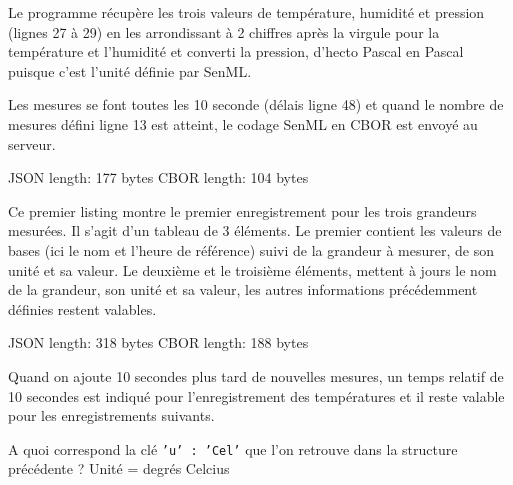 Le programme récupère les trois valeurs de température, humidité et pression (lignes 27 à 29) en les arrondissant à 2 chiffres après la virgule pour la température et l'humidité et converti la pression, d'hecto Pascal en Pascal puisque c'est l'unité définie par SenML. 

Les mesures se font toutes les 10 seconde (délais ligne 48) et quand le nombre de mesures défini ligne 13 est atteint, le codage SenML en CBOR est envoyé au serveur. 

       \vspace{1em}

\begin{termc}
JSON length:  177 bytes
CBOR length:  104 bytes
\end{termc}

Ce premier listing montre le premier enregistrement pour les trois grandeurs mesurées. Il s'agit d'un tableau de 3 éléments. Le premier contient les valeurs de bases (ici le nom et l'heure de référence) suivi de la grandeur à mesurer, de son unité et sa valeur. Le deuxième et le troisième éléments, mettent à jours le nom de la grandeur, son unité et sa valeur, les autres informations précédemment définies restent valables.


\begin{termc}
JSON length:  318 bytes
CBOR length:  188 bytes
 \end{termc}
 
 Quand on ajoute 10 secondes plus tard de nouvelles mesures,  un temps relatif de 10 secondes est indiqué pour l'enregistrement des températures et il reste valable pour les enregistrements suivants.
 
 {A quoi correspond la clé \texttt{'u' : 'Cel'} que l'on retrouve dans la structure précédente ? }
 {Unité = degrés Celcius}
 
